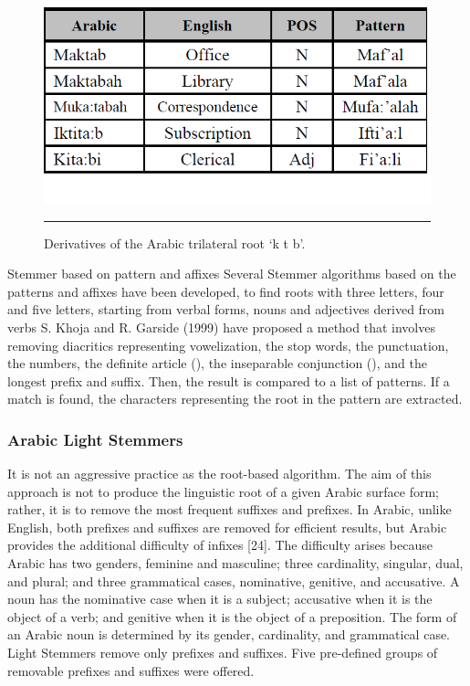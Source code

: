 \begin{figure}[htbp]
	\begin{center}
		\includegraphics{./Figures/pre_6.png}
		\rule{20em}{0.001pt}
	\end{center}
	\caption[Derivatives of the Arabic trilateral root ‘k t b’.]{Derivatives of the Arabic trilateral root ‘k t b’.}
	\label{fig:pre_6}
\end{figure}


Stemmer based on pattern and affixes Several Stemmer algorithms based on the patterns and affixes have been developed, to find roots with three letters, four and five letters, starting from verbal forms, nouns and adjectives derived from verbs S. Khoja and R. Garside (1999) have proposed a method that involves removing diacritics representing vowelization, the stop words, the punctuation, the numbers, the definite article (), the inseparable conjunction (), and the longest prefix and suffix. Then, the result is compared to a list of patterns. If a match is found, the characters representing the root in the pattern are extracted.
\subsubsection{Arabic Light Stemmers}
It is not an aggressive practice as the root-based algorithm. The aim of this approach is not to produce the linguistic root of a given Arabic surface form; rather, it is to remove the most frequent suffixes and prefixes.
In Arabic, unlike English, both prefixes and
suffixes are removed for efficient results, but Arabic provides the additional difficulty of infixes
[24]. The difficulty arises because Arabic has two genders, feminine and masculine; three
cardinality, singular, dual, and plural; and three grammatical cases, nominative, genitive, and
accusative. A noun has the nominative case when it is a subject; accusative when it is the object
of a verb; and genitive when it is the object of a preposition. The form of an Arabic noun is
determined by its gender, cardinality, and grammatical case. Light Stemmers remove only prefixes and suffixes. Five pre-defined groups of removable
prefixes and suffixes were offered.

